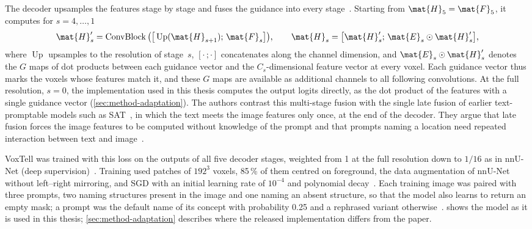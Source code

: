 The decoder upsamples the features stage by stage and fuses the guidance into every stage~\cite[Eqs.~4--6]{rokuss2025voxtellfreetextpromptableuniversal}.
Starting from $\mat{H}_5 = \mat{F}_5$, it computes for $s = 4, \dots, 1$
\begin{equation}
\mat{H}'_s = \operatorname{ConvBlock}\big(\big[\operatorname{Up}(\mat{H}_{s+1});\, \mat{F}_s\big]\big),
\qquad
\mat{H}_s = \big[\mat{H}'_s;\, \mat{E}_s \odot \mat{H}'_s\big],
\label{eq:bg-voxtell-fusion}
\end{equation}
where $\operatorname{Up}$ upsamples to the resolution of stage~$s$, $[\cdot\,;\cdot]$ concatenates along the channel dimension, and $\mat{E}_s \odot \mat{H}'_s$ denotes the $G$ maps of dot products between each guidance vector and the $C_s$-dimensional feature vector at every voxel.
Each guidance vector thus marks the voxels whose features match it, and these $G$ maps are available as additional channels to all following convolutions.
At the full resolution, $s = 0$, the implementation used in this thesis computes the output logits directly, as the dot product of the features with a single guidance vector (\cref{sec:method-adaptation}).
The authors contrast this multi-stage fusion with the single late fusion of earlier text-promptable models such as SAT~\cite{zhao2025sat}, in which the text meets the image features only once, at the end of the decoder.
They argue that late fusion forces the image features to be computed without knowledge of the prompt and that prompts naming a location need repeated interaction between text and image~\cite[p.~4]{rokuss2025voxtellfreetextpromptableuniversal}.

VoxTell was trained with this loss on the outputs of all five decoder stages, weighted from 1 at the full resolution down to $1/16$ as in nnU-Net (deep supervision)~\cite[Eq.~7, Suppl.~p.~1]{rokuss2025voxtellfreetextpromptableuniversal}.
Training used patches of $192^3$ voxels, 85\,\% of them centred on foreground, the data augmentation of nnU-Net without left--right mirroring, and SGD with an initial learning rate of $10^{-4}$ and polynomial decay~\cite[Suppl.~p.~1]{rokuss2025voxtellfreetextpromptableuniversal}.
Each training image was paired with three prompts, two naming structures present in the image and one naming an absent structure, so that the model also learns to return an empty mask; a prompt was the default name of its concept with probability 0.25 and a rephrased variant otherwise~\cite[Suppl.~p.~1]{rokuss2025voxtellfreetextpromptableuniversal}.
 shows the model as it is used in this thesis; \cref{sec:method-adaptation} describes where the released implementation differs from the paper.

